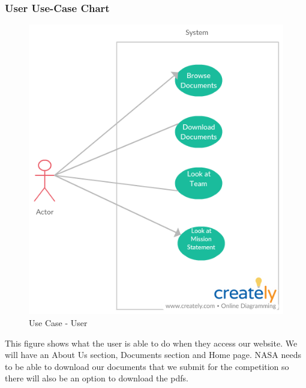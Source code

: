 \documentclass[onecolumn, draftclsnofoot, 10pt, compsoc]{IEEEtran}
\begin{document}
\subsubsection{User Use-Case Chart}
\begin{figure}[!htp]
    \centering
    \includegraphics[scale = 0.5, width = 1 \textwidth,angle=0]{Figures/Website_User_Use_Case.png}
    \caption{Use Case - User}
    \label{fig:my_label}
\end{figure}
This figure shows what the user is able to do when they access our website. We will have an About Us section, Documents section and Home page. NASA needs to be able to download our documents that we submit for the competition so there will also be an option to download the pdfs. 
\end{document}
